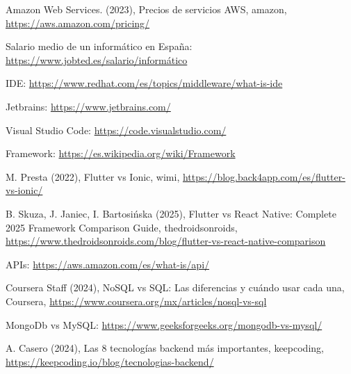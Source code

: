 \begin{thebibliography}{9}

\raggedright %

 Amazon Web Services. (2023), Precios de servicios AWS, amazon, \href{https://aws.amazon.com/pricing/}{https://aws.amazon.com/pricing/}

 Salario medio de un informático en España: \href{https://www.jobted.es/salario/inform%C3%A1tico}{https://www.jobted.es/salario/informático}

IDE: \href{https://www.redhat.com/es/topics/middleware/what-is-ide}{https://www.redhat.com/es/topics/middleware/what-is-ide}

Jetbrains: \href{https://www.jetbrains.com/}{https://www.jetbrains.com/}

Visual Studio Code: \href{https://code.visualstudio.com/}{https://code.visualstudio.com/}

Framework: \href{https://es.wikipedia.org/wiki/Framework}{https://es.wikipedia.org/wiki/Framework}

 M. Presta (2022), Flutter vs Ionic, wimi,  \href{https://blog.back4app.com/es/flutter-vs-ionic/}{https://blog.back4app.com/es/flutter-vs-ionic/}

B. Skuza, J. Janiec, I. Bartosińska (2025), Flutter vs React Native: Complete 2025 Framework Comparison Guide, thedroidsonroids, \href{https://www.thedroidsonroids.com/blog/flutter-vs-react-native-comparison}{https://www.thedroidsonroids.com/blog/flutter-vs-react-native-comparison}

APIs: \href{https://aws.amazon.com/es/what-is/api/}{https://aws.amazon.com/es/what-is/api/}

 Coursera Staff (2024), NoSQL vs SQL: Las diferencias y cuándo usar cada una, Coursera,  \href{https://www.coursera.org/mx/articles/nosql-vs-sql}{https://www.coursera.org/mx/articles/nosql-vs-sql}

MongoDb vs MySQL: \href{https://www.geeksforgeeks.org/mongodb-vs-mysql/}{https://www.geeksforgeeks.org/mongodb-vs-mysql/}

A. Casero (2024), Las 8 tecnologías backend más importantes, keepcoding,  \href{https://keepcoding.io/blog/tecnologias-backend/}{https://keepcoding.io/blog/tecnologias-backend/}


\end{thebibliography}
